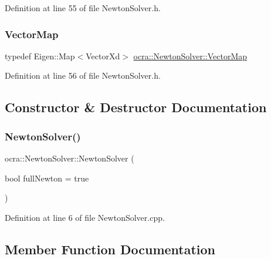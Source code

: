 Definition at line 55 of file Newton\+Solver.\+h.

\hypertarget{classocra_1_1NewtonSolver_aad21c090baadce638c9613f4b9d1d5c4}{}\label{classocra_1_1NewtonSolver_aad21c090baadce638c9613f4b9d1d5c4} 
\subsubsection{\texorpdfstring{Vector\+Map}{VectorMap}}
{\footnotesize\ttfamily typedef Eigen\+::\+Map$<$Vector\+Xd$>$ \hyperlink{classocra_1_1NewtonSolver_aad21c090baadce638c9613f4b9d1d5c4}{ocra\+::\+Newton\+Solver\+::\+Vector\+Map}}



Definition at line 56 of file Newton\+Solver.\+h.



\subsection{Constructor \& Destructor Documentation}
\hypertarget{classocra_1_1NewtonSolver_ab66a0ba4ef83a14fd2c7b39c2bae78b9}{}\label{classocra_1_1NewtonSolver_ab66a0ba4ef83a14fd2c7b39c2bae78b9} 
\subsubsection{\texorpdfstring{Newton\+Solver()}{NewtonSolver()}}
{\footnotesize\ttfamily ocra\+::\+Newton\+Solver\+::\+Newton\+Solver (\begin{DoxyParamCaption}\item[{bool}]{full\+Newton = {\ttfamily true} }\end{DoxyParamCaption})}



Definition at line 6 of file Newton\+Solver.\+cpp.



\subsection{Member Function Documentation}
\hypertarget{classocra_1_1NewtonSolver_a312cf17ad5b175d29a0fd7424449d630}{}\label{classocra_1_1NewtonSolver_a312cf17ad5b175d29a0fd7424449d630} 
